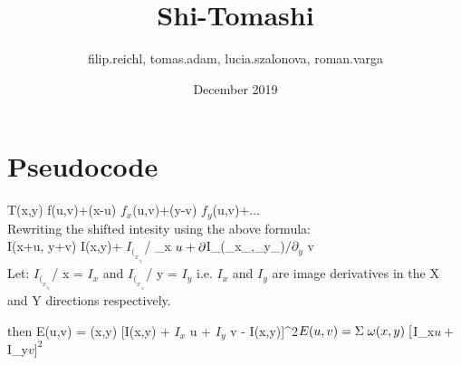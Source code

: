 \documentclass{article}
\title{Shi-Tomashi}
\author{filip.reichl, tomas.adam, lucia.szalonova, roman.varga }
\date{December 2019}
\begin{document}
\maketitle

\section{Pseudocode}
 T(x,y) \approx f(u,v)+(x-u) $f_x$(u,v)+(y-v) $f_y$(u,v)+... \\
 


Rewriting the shifted intesity using the above formula:\\ 
I(x+u, y+v) \approx I(x,y)+ \partial $I_(_x_,_y_)$/ \partial _x$ \hspace{0,1cm} u +  \partial $I_(_x_,_y_)$/ \partial _y$ \hspace{0,1cm} v \\


Let: \partial $I_(_x_,_y_)$/ \partial x = $I_x$\hspace{0,2cm} and 
\hspace{0,2cm}\partial  $I_(_x_,_y_)$/ \partial y = $I_y$ \hfill \medskip \break 
i.e. \hspace{0,2cm} $I_x$ \hspace{0,2cm} and \hspace{0,2cm} $I_y$ \hspace{0,2cm} are \hspace{0,2cm} image \hspace{0,1cm} derivatives  \hspace{0,1cm}
in \hspace{0,1cm} the\hspace{0,1cm} X \hspace{0,1cm}and\hspace{0,1cm} Y \hspace{0,1cm}directions\hspace{0,1cm} respectively. 

then
\break 
\vspace{1cm} 
E(u,v) = \Sigma \hspace{0,1cm} \omega(x,y) \hspace{0,1cm} [I(x,y) + $I_x$  u + $I_y$  v - I(x,y)]^2$  

E(u,v) = \Sigma \hspace{0,1cm} \omega(x,y)\hspace{0,1cm}[$I_x$u + $I_y$v]^2$ \\
\end{document}
